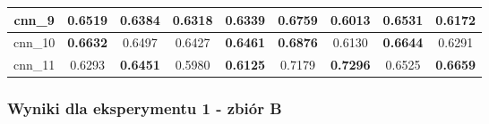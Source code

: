 \begin{table}[p]
\begin{tabular}{|c|c|c|c|c|c|c|c|c|}
        cnn\_9   & \textbf{0.6519}                     & 0.6384                              & 0.6318                              & \textbf{0.6339}                     & \textbf{0.6759}                     & 0.6013                              & \textbf{0.6531}                     & 0.6172                              \\ \hline
        cnn\_10  & \textbf{0.6632}                     & 0.6497                              & 0.6427                              & \textbf{0.6461}                     & \textbf{0.6876}                     & 0.6130                              & \textbf{0.6644}                     & 0.6291                              \\ \hline
        cnn\_11  & 0.6293                              & \textbf{0.6451}                     & 0.5980                              & \textbf{0.6125}                     & 0.7179                              & \textbf{0.7296}                     & 0.6525                              & \textbf{0.6659}                     \\ \hline
    \end{tabular}
\end{table}


\newpage %
\subsubsection{Wyniki dla eksperymentu 1 - zbiór B}


